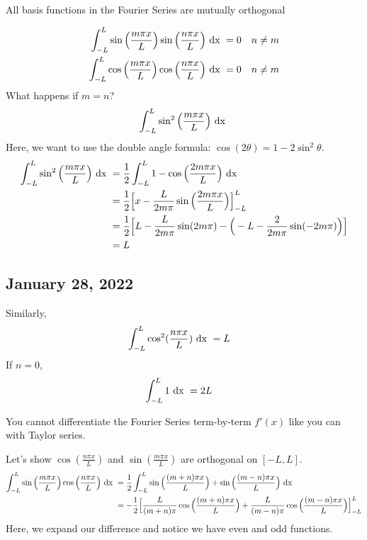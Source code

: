 \documentclass{article}
\begin{document}
  \thm All basis functions in the Fourier Series are mutually orthogonal

  \begin{align}
    \int^L_{-L} \sin\Big(\frac{m \pi x}{L}\Big) \sin \Big( \frac{n \pi x}{L} \Big) \text{ dx } & = 0 \quad n \neq m\\
    \int^L_{-L} \cos\Big(\frac{m \pi x}{L}\Big) \cos \Big( \frac{n \pi x}{L} \Big) \text{ dx } & = 0 \quad n \neq m
  \end{align}
  What happens if $m = n$?
  \begin{align}
    \int^L_{-L} \sin^2\Big( \frac{m \pi x}{L} \Big) \text{ dx }
  \end{align}
  Here, we want to use the double angle formula: $\cos(2\theta) = 1 - 2\sin^2 \theta$.
  \begin{align}
    \int^L_{-L} \sin^2\Big( \frac{m \pi x}{L} \Big) \text{ dx } & =
    \frac{1}{2} \int^L_{-L} 1 - \cos\Big(\frac{2 m \pi x}{L}\Big) \text{ dx }\\ & =
    \frac{1}{2} \Big[ x - \frac{L}{2 m \pi}\sin\Big(\frac{2 m \pi x}{L}\Big)\Big]^L_{-L}\\ & =
    \frac{1}{2} \Big[L - \frac{L}{2 m \pi} \sin(2 m \pi) - \Big(-L - \frac{2}{2 m \pi} \sin(-2 m \pi)\Big)\Big]\\ & =
    L
  \end{align}

  \subsection*{January 28, 2022}
  Similarly,
  \begin{align}
    \int^L_{-L} \cos^2 (\frac{n\pi x}{L}) \text{ dx } & = L
  \end{align}
  If $n = 0$,
  \begin{align}
    \int^L_{-L} 1 \text{ dx } & = 2L
  \end{align}

  \note You cannot differentiate the Fourier Series term-by-term $f'(x)$ like you can with Taylor series.

  Let's show $\cos(\frac{n \pi x}{L})$ and $\sin(\frac{m \pi x}{L})$ are orthogonal on $[-L, L]$.
  \begin{align}
    \int^L_{-L} \sin\Big(\frac{m \pi x}{L}\Big) \cos \Big( \frac{n \pi x}{L} \Big) \text{ dx } & = \frac{1}{2} \int^L_{-L} \sin\Big( \frac{(m + n) \pi x}{L} \Big) + \sin\Big( \frac{(m - n) \pi x}{L} \Big) \text{ dx }\\
    & = - \frac{1}{2} \Big[ \frac{L}{(m + n) \pi} \cos\Big(\frac{(m + n) \pi x}{L} \Big) + \frac{L}{(m - n)\pi} \cos\Big( \frac{(m - n) \pi x}{L} \Big) \Big]^L_{-L}
  \end{align}
  Here, we expand our difference and notice we have even and odd functions.
\end{document}

